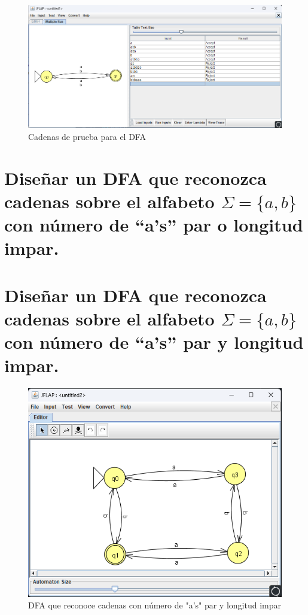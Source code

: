 \documentclass[11pt]{report}
\begin{document}
\begin{figure}[H]
  \centering
  \includegraphics[scale=0.65]{img/DFA_02_test.png}
  \caption{Cadenas de prueba para el DFA}
\end{figure}

\newpage

\section{Diseñar un DFA que reconozca cadenas sobre el alfabeto $\Sigma = \{a, b\}$ con número de “a's” par o longitud impar.}

\newpage

\section{Diseñar un DFA que reconozca cadenas sobre el alfabeto $\Sigma = \{a, b\}$ con número de “a's” par y longitud impar.}
\begin{figure}[H]
  \centering
  \includegraphics[scale=0.7]{img/DFA_04.png}
  \caption{DFA que reconoce cadenas con número de "a's" par y longitud impar}
\end{figure}
\end{document}
